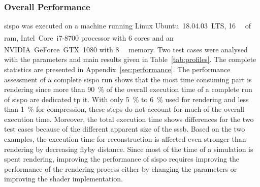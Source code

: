 \subsubsection{Overall Performance}
\gls{sispo} was executed on a machine running Linux Ubuntu~18.04.03~LTS, \SI{16}{\giga\byte} of \gls{ram}, Intel\textsuperscript{\textregistered}~Core\texttrademark~i7-8700 processor with \SI{6}{} cores and an NVIDIA\textsuperscript{\textregistered}~GeForce~GTX~1080 with \SI{8}{\giga\byte} memory.
Two test cases were analysed with the parameters and main results given in Table~\ref{tab:profiles}. The complete statistics are presented in Appendix~\ref{sec:performance}. The performance assessment of a complete \gls{sispo} run shows that the most time consuming part is rendering since more than \SI{90}{\percent} of the overall execution time of a complete run of \gls{sispo} are dedicated tp it. With only \SI{5}{\percent} to \SI{6}{\percent} used for rendering and less than \SI{1}{\percent} for compression, these steps do not account for much of the overall execution time. Moreover, the total execution time shows differences for the two test cases because of the different apparent size of the \gls{sssb}. Based on the two examples, the execution time for reconstruction is affected even stronger than rendering by decreasing flyby distance.
Since most of the time of a simulation is spent rendering, improving the performance of \gls{sispo} requires improving the performance of the rendering process either by changing the parameters or improving the shader implementation.

\begin{table}[htb]
    \centering
    \caption{Summary of two profiles obtained while executing a complete run of \gls{sispo}, i.e. rendering, compression and reconstruction. More than \SI{90}{\percent} of total time is spent rendering images. Values are rounded to one decimal precision.}
    \label{tab:profiles}
\end{table}

